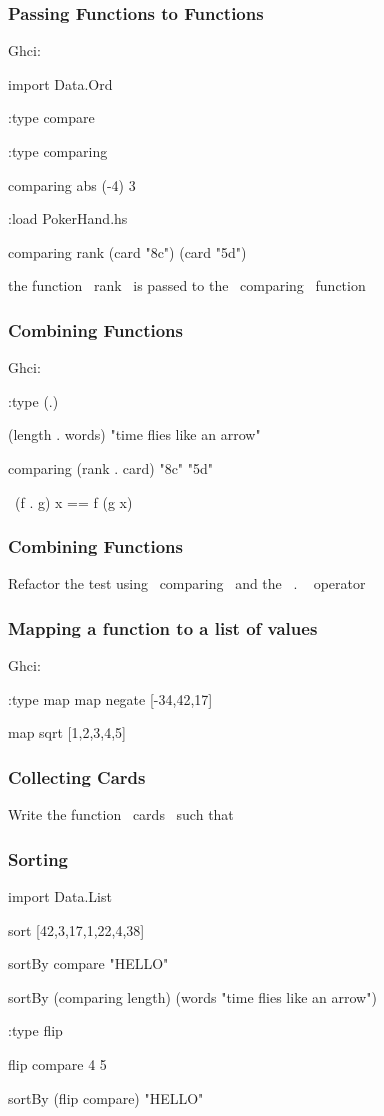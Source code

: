 \documentclass[11pt,xcolor={dvipsnames}]{beamer}
\newcommand{\tc}{\textcolor}
\newcommand{\key}[1]{\tc{orange}{#1}}
\newcommand{\rk}{\enskip{\key{$\hookleftarrow$}}}
\newcommand{\lstT}[1]{}
\begin{document}
\begin{frame}[fragile]
\frametitle{Passing Functions to Functions}
Ghci:
\begin{term}
import Data.Ord\rk

:type compare\rk

:type comparing\rk

comparing abs (-4) 3\rk

:load PokerHand.hs\rk

comparing rank (card "8c") (card "5d")\rk
\end{term}
the function ~rank~ is passed to the ~comparing~ function
\end{frame}
\begin{frame}[fragile]
\frametitle{Combining Functions}
Ghci:
\begin{term}
:type (.)\rk

(length . words) "time flies like an arrow"\rk

comparing (rank . card) "8c" "5d"\rk
\end{term}
~(f . g) x == f (g x)~ 
\end{frame}
\begin{frame}[fragile]
\frametitle{Combining Functions}
Refactor the test using ~comparing~ and the ~. ~ operator
\lstT{032}
\end{frame}
\begin{frame}[fragile]
\frametitle{Mapping a function to a list of values}
Ghci:
\begin{term}
:type map\rk
map negate [-34,42,17]\rk

map sqrt [1,2,3,4,5]\rk
\end{term}
\end{frame}
\begin{frame}[fragile]
\frametitle{Collecting Cards}
Write the function ~cards~ such that
\lstT{034}
\end{frame}
\begin{frame}[fragile]
\frametitle{Sorting}
\begin{term}
import Data.List\rk

sort [42,3,17,1,22,4,38]\rk

sortBy compare "HELLO"\rk

sortBy (comparing length) (words "time flies like an arrow")\rk

:type flip\rk

flip compare 4 5\rk

sortBy (flip compare) "HELLO"\rk
\end{term}
\end{frame}
\end{document}
